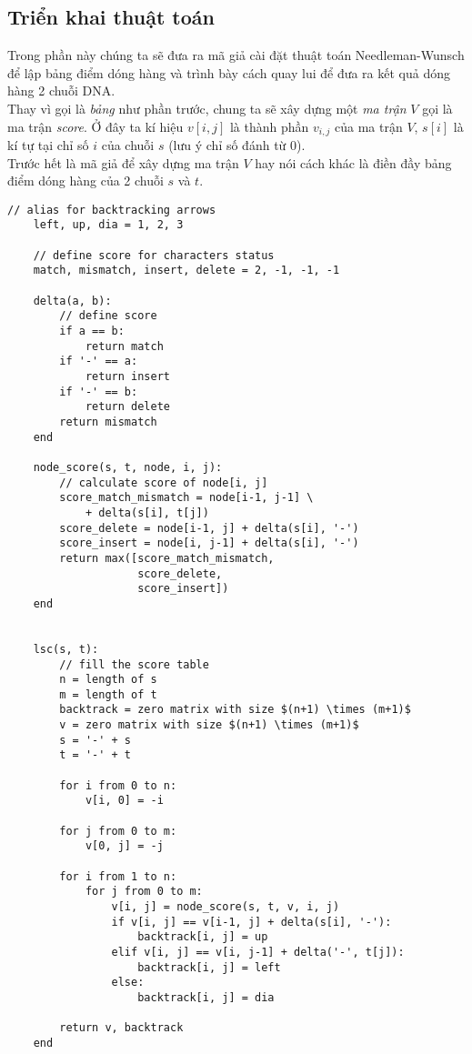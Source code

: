 \subsection{Triển khai thuật toán}
Trong phần này chúng ta sẽ đưa ra mã giả cài đặt thuật toán Needleman-Wunsch để lập bảng điểm
dóng hàng và trình bày cách quay lui để đưa ra kết quả dóng hàng 2 chuỗi DNA. \\
Thay vì gọi là \textit{bảng} như phần trước, chung ta sẽ xây dựng một 
\textit{ma trận} $V$ gọi là ma trận \textit{score}.
Ở đây ta kí hiệu $v[i, j]$ là thành phần $v_{i,j}$ của ma trận $V$,
$s[i]$ là kí tự tại chỉ số $i$ của chuỗi $s$ (lưu ý chỉ số đánh từ $0$). \\
Trước hết là mã giả để  xây dựng ma trận $V$ hay nói cách khác là điền đầy 
bảng điểm dóng hàng của 2 chuỗi $s$ và $t$. \\

\begin{lstlisting}[style=algo]
    // alias for backtracking arrows
    left, up, dia = 1, 2, 3 

    // define score for characters status
    match, mismatch, insert, delete = 2, -1, -1, -1

    delta(a, b):
        // define score
        if a == b:
            return match
        if '-' == a:
            return insert
        if '-' == b:
            return delete
        return mismatch
    end

    node_score(s, t, node, i, j):
        // calculate score of node[i, j]
        score_match_mismatch = node[i-1, j-1] \
            + delta(s[i], t[j])
        score_delete = node[i-1, j] + delta(s[i], '-')
        score_insert = node[i, j-1] + delta(s[i], '-')
        return max([score_match_mismatch, 
                    score_delete, 
                    score_insert])
    end


    lsc(s, t):
        // fill the score table
        n = length of s
        m = length of t
        backtrack = zero matrix with size $(n+1) \times (m+1)$
        v = zero matrix with size $(n+1) \times (m+1)$
        s = '-' + s
        t = '-' + t

        for i from 0 to n:
            v[i, 0] = -i

        for j from 0 to m:
            v[0, j] = -j

        for i from 1 to n:
            for j from 0 to m:
                v[i, j] = node_score(s, t, v, i, j)
                if v[i, j] == v[i-1, j] + delta(s[i], '-'):
                    backtrack[i, j] = up
                elif v[i, j] == v[i, j-1] + delta('-', t[j]):
                    backtrack[i, j] = left
                else:
                    backtrack[i, j] = dia

        return v, backtrack
    end
\end{lstlisting}

